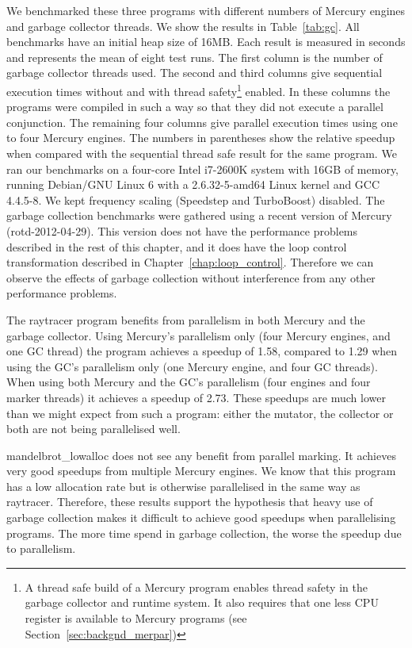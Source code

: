 

We benchmarked these three programs with different numbers of Mercury
engines and garbage collector threads.
We show the results in Table~\ref{tab:gc}.
All benchmarks have an initial heap size of 16MB.
Each result is measured in seconds and represents the mean of eight test runs.
The first column is the number of garbage collector threads used.
The second and third columns give sequential execution times
without and with thread safety\footnote{
    A thread safe build of a Mercury program enables thread safety in the
    garbage collector and runtime system.
    It also requires that one less CPU register is available to Mercury
    programs (see Section~\ref{sec:backgnd_merpar})}
enabled.
In these columns the programs were compiled in such a way so that they did
not execute a parallel conjunction.
The remaining four columns give parallel execution times using one to four
Mercury engines.
The numbers in parentheses show the relative speedup when compared with the
sequential thread safe result for the same program.
\label{cabsav}
We ran our benchmarks on
a four-core Intel i7-2600K system
with 16GB of memory,
running Debian/GNU Linux 6
with a 2.6.32-5-amd64 Linux kernel and GCC 4.4.5-8.
We kept frequency scaling (Speedstep and TurboBoost) disabled.
The garbage collection benchmarks were gathered using a recent version of
Mercury (rotd-2012-04-29).
This version does not have the performance problems described in the
rest of this chapter,
and it does have the loop control transformation described
in Chapter~\ref{chap:loop_control}.
Therefore we can observe the effects of garbage collection without
interference from any other performance problems.

The raytracer program benefits from parallelism in both Mercury and the
garbage collector.
Using Mercury's parallelism only
(four Mercury engines, and one GC thread)
the program achieves a speedup of 1.58,
compared to 1.29 when using the GC's parallelism only (one Mercury engine,
and four GC threads).
When using both Mercury and the GC's parallelism (four engines and four
marker threads)
it achieves a speedup of 2.73.
These speedups are much lower than we might expect from such a program:
either the mutator, the collector or both are not being parallelised well.

mandelbrot\_lowalloc does not see any benefit from parallel marking.
It achieves very good speedups from multiple Mercury engines.
We know that this program has a low allocation rate
but is otherwise parallelised in the same way as raytracer.
Therefore,
these results support the hypothesis that heavy use of garbage collection
makes it difficult to achieve good speedups when parallelising programs.
The more time spend in garbage collection,
the worse the speedup due to parallelism.

